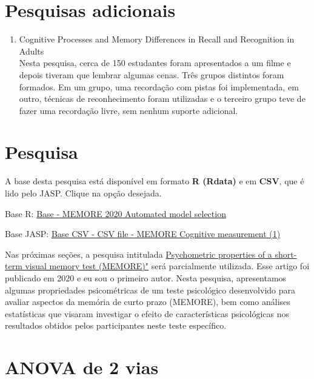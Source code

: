 \documentclass[
]{book}
\providecommand{\tightlist}{%
  \setlength{\itemsep}{0pt}\setlength{\parskip}{0pt}}
\begin{document}
\hypertarget{pesquisas-adicionais-4}{%
\section{Pesquisas adicionais}\label{pesquisas-adicionais-4}}

\begin{enumerate}
\def\labelenumi{\arabic{enumi}.}
\tightlist
\item
  Cognitive Processes and Memory Differences in Recall and Recognition in Adults\\
  Nesta pesquisa, cerca de 150 estudantes foram apresentados a um filme e depois tiveram que lembrar algumas cenas. Três grupos distintos foram formados. Em um grupo, uma recordação com pistas foi implementada, em outro, técnicas de reconhecimento foram utilizadas e o terceiro grupo teve de fazer uma recordação livre, sem nenhum suporte adicional.
\end{enumerate}

\hypertarget{pesquisa-5}{%
\section{Pesquisa}\label{pesquisa-5}}

A base desta pesquisa está disponível em formato \textbf{R (Rdata)} e em \textbf{CSV}, que é lido pelo JASP. Clique na opção desejada.

Base R: \href{https://github.com/anovabr/mqt/raw/master/bases/Base\%20-\%20MEMORE\%202020\%20Automated\%20model\%20selection.RData}{Base - MEMORE 2020 Automated model selection}

Base JASP: \href{https://github.com/anovabr/mqt/raw/master/bases/bases_csv_jasp.zip}{Base CSV - CSV file - MEMORE Cognitive measurement (1)}

Nas próximas seções, a pesquisa intitulada \href{https://www.neuropsicolatina.org/index.php/Neuropsicologia_Latinoamericana/article/view/545}{Psychometric properties of a short-term visual memory test (MEMORE)"} será parcialmente utilizada. Esse artigo foi publicado em 2020 e eu sou o primeiro autor. Nesta pesquisa, apresentamos algumas propriedades psicométricas de um teste psicológico desenvolvido para avaliar aspectos da memória de curto prazo (MEMORE), bem como análises estatísticas que visaram investigar o efeito de características psicológicas nos resultados obtidos pelos participantes neste teste específico.

\hypertarget{anova-de-2-vias}{%
\section{ANOVA de 2 vias}\label{anova-de-2-vias}}
\end{document}
